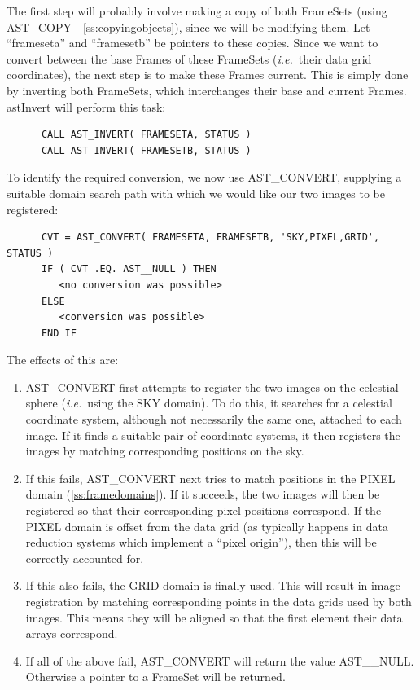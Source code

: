 \documentclass[twoside,11pt]{article}
\newcommand{\htmlref}[2]{#1}
\newcommand{\secref}[1]{\S\ref{#1}}
\renewcommand{\secref}[1]{\ref{#1}}
\begin{document}
The first step will probably involve making a copy of both FrameSets
(using \htmlref{AST\_COPY}{AST_COPY}---\secref{ss:copyingobjects}), since we will be
modifying them. Let ``frameseta'' and ``framesetb'' be pointers to
these copies. Since we want to convert between the base Frames of
these FrameSets ({\em{i.e.}}\ their data grid coordinates), the next
step is to make these Frames current. This is simply done by inverting
both FrameSets, which interchanges their base and current
Frames. astInvert will perform this task:

\small
\begin{verbatim}
      CALL AST_INVERT( FRAMESETA, STATUS )
      CALL AST_INVERT( FRAMESETB, STATUS )
\end{verbatim}
\normalsize

To identify the required conversion, we now use \htmlref{AST\_CONVERT}{AST_CONVERT},
supplying a suitable domain search path with which we would like our
two images to be registered:

\small
\begin{verbatim}
      CVT = AST_CONVERT( FRAMESETA, FRAMESETB, 'SKY,PIXEL,GRID', STATUS )
      IF ( CVT .EQ. AST__NULL ) THEN
         <no conversion was possible>
      ELSE
         <conversion was possible>
      END IF
\end{verbatim}
\normalsize

The effects of this are:

\begin{enumerate}
\item AST\_CONVERT first attempts to register the two images on the
celestial sphere ({\em{i.e.}}\ using the SKY domain). To do this, it
searches for a celestial coordinate system, although not necessarily
the same one, attached to each image.  If it finds a suitable pair of
coordinate systems, it then registers the images by matching
corresponding positions on the sky.

\item If this fails, AST\_CONVERT next tries to match positions in the
PIXEL domain (\secref{ss:framedomains}). If it succeeds, the two
images will then be registered so that their corresponding pixel
positions correspond. If the PIXEL domain is offset from the data grid
(as typically happens in data reduction systems which implement a
``pixel origin''), then this will be correctly accounted for.

\item If this also fails, the GRID domain is finally used. This will
result in image registration by matching corresponding points in the
data grids used by both images. This means they will be
aligned so that the first element their data arrays correspond.

\item If all of the above fail, AST\_CONVERT will return the value
AST\_\_NULL. Otherwise a pointer to a FrameSet will be returned.
\end{enumerate}
\end{document}
